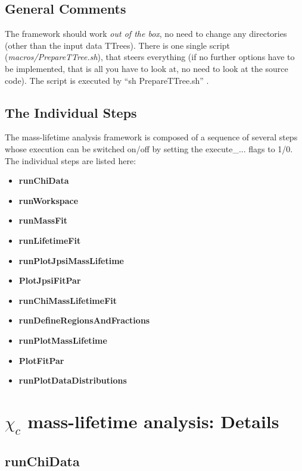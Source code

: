 \documentclass{article}
\begin{document}
\subsection{General Comments}

The framework should work \emph{out of the box}, no need to change any directories (other than the input data TTrees). There is one single script (\emph{macros/PrepareTTree.sh}), that steers everything (if no further options have to be implemented, that is all you have to look at, no need to look at the source code). The script is executed by ``sh PrepareTTree.sh'' .

\subsection{The Individual Steps}

The mass-lifetime analysis framework is composed of a sequence of several steps whose execution can be switched on/off by setting the execute\_... flags to 1/0. The individual steps are listed here:

\begin{itemize}
\item {\bf runChiData}
\item {\bf runWorkspace}
\item {\bf runMassFit}
\item {\bf runLifetimeFit}
\item {\bf runPlotJpsiMassLifetime}
\item {\bf PlotJpsiFitPar}
\item {\bf runChiMassLifetimeFit}
\item {\bf runDefineRegionsAndFractions}
\item {\bf runPlotMassLifetime}
\item {\bf PlotFitPar}
\item {\bf runPlotDataDistributions}
\end{itemize}



\section{$\chi_c$ mass-lifetime analysis: Details}

\subsection{runChiData}  
\end{document}
